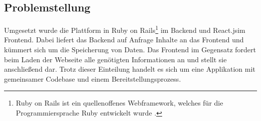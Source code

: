 \subsection{Problemstellung}

Umgesetzt wurde die Plattform in Ruby on Rails\footnote{
Ruby on Rails ist ein quellenoffenes Webframework, welches für die Programmiersprache Ruby entwickelt wurde \parencites{ruby_org}[vgl.][S. 24]{sieben_wochen}.
} im Backend und React.js\footnotemark im Frontend. Dabei liefert das Backend auf Anfrage Inhalte an das Frontend und kümmert sich um die Speicherung von Daten. Das Frontend im Gegensatz fordert beim Laden der Webseite alle genötigten Informationen an und stellt sie anschließend dar. Trotz dieser Einteilung handelt es sich um eine Applikation mit gemeinsamer Codebase und einem Bereitstellungsprozess.


